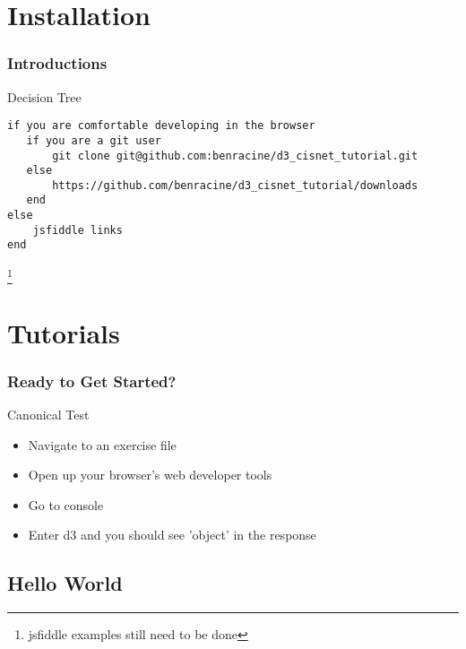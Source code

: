 \documentclass{beamer}
\begin{document}
\section{Installation}


\begin{frame}[fragile]
    \frametitle{Introductions}
    \begin{block}{Decision Tree}
        \tiny{
        \begin{verbatim}
if you are comfortable developing in the browser
   if you are a git user
       git clone git@github.com:benracine/d3_cisnet_tutorial.git
   else
       https://github.com/benracine/d3_cisnet_tutorial/downloads
   end
else
    jsfiddle links
end
        \end{verbatim}
        }
    \end{block}
    \footnote{jsfiddle examples still need to be done}
\end{frame}


\section{Tutorials}


\begin{frame}
    \frametitle{Ready to Get Started?}
    \begin{block}{Canonical Test}
        \begin{itemize}
        \pause
        \item Navigate to an exercise file
        \pause
        \item Open up your browser's web developer tools
        \pause
        \item Go to console
        \pause
        \item Enter d3 and you should see 'object' in the response
        \end{itemize}
    \end{block}
\end{frame}


\subsection{Hello World}
\end{document}
